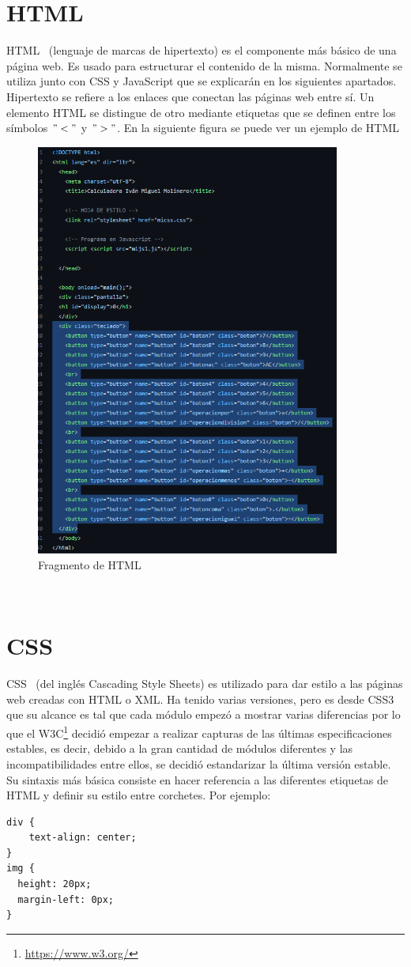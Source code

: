 \documentclass[a4paper, 12pt]{book}
\begin{document}
\section{HTML}
\label{sec:html}
HTML~\cite{website:HTML}  (lenguaje de marcas de hipertexto) es el componente más básico de una página web. Es usado para estructurar el contenido de la misma. Normalmente se utiliza junto con CSS y JavaScript que se explicarán en los siguientes apartados.
Hipertexto se refiere a los enlaces que conectan las páginas web entre sí.
Un elemento HTML se distingue de otro mediante etiquetas que se definen entre los símbolos $"<"$ y $">"$. 
En la siguiente figura se puede ver un ejemplo de HTML
\begin{figure}
  \centering
  \includegraphics[width=10cm, keepaspectratio]{img/html.png}
  \caption{Fragmento de HTML}\label{fig:html}
\end{figure}
\\
\section{CSS}
\label{sec:CSS}
CSS~\cite{website:CSS} (del inglés Cascading Style Sheets) es utilizado para dar estilo a las páginas web creadas con HTML o XML. Ha tenido varias versiones, pero es desde CSS3 que su alcance es tal que cada módulo empezó a mostrar varias diferencias por lo que el W3C\footnote{\url{https://www.w3.org/}}  decidió empezar a realizar capturas de las últimas especificaciones estables, es decir, debido a la gran cantidad de módulos diferentes y las incompatibilidades entre ellos, se decidió estandarizar la última versión estable.
Su sintaxis más básica consiste en hacer referencia a las diferentes etiquetas de HTML y definir su estilo entre corchetes. Por ejemplo:
\begin{verbatim}
div {
    text-align: center;
}
img {
  height: 20px;
  margin-left: 0px;
}
\end{verbatim}
\end{document}
